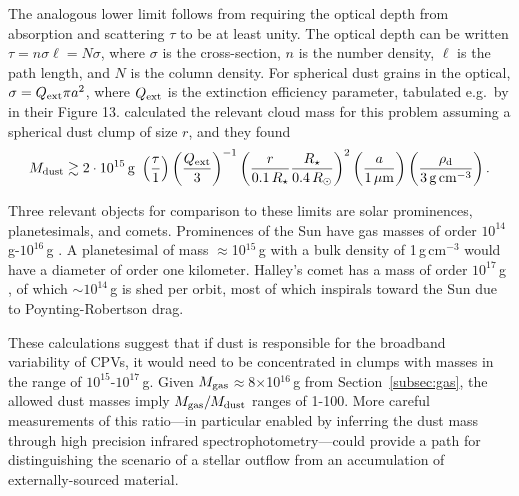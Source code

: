 \documentclass{nature3}
\begin{document}
\begin{methods}
The analogous lower limit follows from requiring the optical depth
from absorption and scattering $\tau$ to be at least unity.  The
optical depth can be written $\tau = n \sigma \ell = N \sigma$, where
$\sigma$ is the cross-section, $n$ is the number density, $\ell$ is
the path length, and $N$ is the column density.  For spherical dust
grains in the optical, $\sigma = Q_{\rm ext} \pi a^2$, where $Q_{\rm
ext}$ is the extinction efficiency parameter, tabulated e.g.~by
\cite{Croll2014} in their Figure 13.  \cite{Sanderson2023} calculated
the relevant cloud mass for this problem assuming a spherical dust clump of
size $r$, and they found
\begin{equation}
  M_{\rm dust} \gtrsim 2 \cdot 10^{15}\, {\rm g}\ 
  \left( \frac{\tau}{1} \right)
  \left( \frac{Q_{\rm ext}}{3} \right)^{-1}
  \left( \frac{r}{0.1\,R_\star} \frac{R_\star}{0.4\,R_\odot} \right)^2
  \left( \frac{a}{1\,\mathrm{\mu m}} \right)
  \left( \frac{\rho_{\rm d}}{3\,\mathrm{g\,cm^{-3}}} \right).
\end{equation}

Three relevant objects for comparison to these limits are solar
prominences, planetesimals, and comets.  Prominences of the Sun
have gas masses of order $10^{14}$\,g-$10^{16}$\,g
\cite{VialEngvold2015}.  A planetesimal of mass $\approx$10$^{15}$\,g
with a bulk density of 1\,g\,cm$^{-3}$ would have a diameter of order
one kilometer.  Halley's comet has a mass of order $10^{17}$\,g
\cite{Rickman1989}, of which $\sim$$10^{14}$\,g is shed per orbit,
most of which inspirals toward the Sun due to Poynting-Robertson drag.

These calculations suggest that if dust is responsible for the
broadband variability of CPVs, it would need to be concentrated in
clumps with masses in the range of $10^{15}$-$10^{17}$\,g.  Given
$M_{\rm gas}$$\approx$8$\times$10$^{16}$\,g from
Section~\ref{subsec:gas}, the allowed dust masses imply $M_{\rm
gas}/M_{\rm dust}$ ranges of 1-100.  More careful measurements of this
ratio---in particular enabled by inferring the dust mass through high
precision infrared spectrophotometry---could provide a path for
distinguishing the scenario of a stellar outflow from an 
accumulation of externally-sourced material.





\end{methods}
\end{document}
